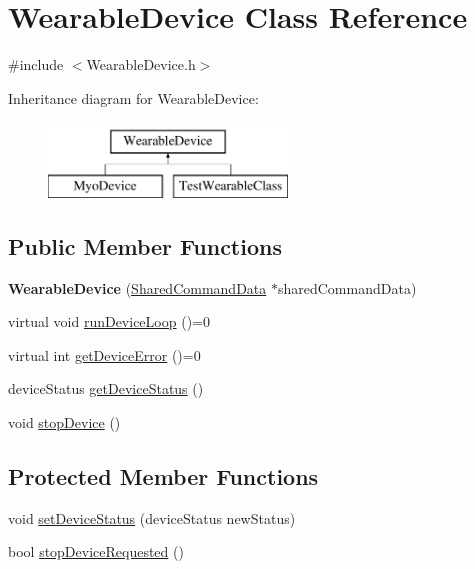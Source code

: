 \hypertarget{class_wearable_device}{\section{Wearable\+Device Class Reference}
\label{class_wearable_device}
}


{\ttfamily \#include $<$Wearable\+Device.\+h$>$}

Inheritance diagram for Wearable\+Device\+:\begin{figure}[H]
\begin{center}
\leavevmode
\includegraphics[height=2.000000cm]{class_wearable_device}
\end{center}
\end{figure}
\subsection*{Public Member Functions}
\begin{DoxyCompactItemize}
\item 
\hypertarget{class_wearable_device_a273b604df5c2136cf7f9c114e4258366}{{\bfseries Wearable\+Device} (\hyperlink{class_shared_command_data}{Shared\+Command\+Data} $\ast$shared\+Command\+Data)}\label{class_wearable_device_a273b604df5c2136cf7f9c114e4258366}

\item 
virtual void \hyperlink{class_wearable_device_a37bf388865b8bcf162e3fe89a23bd3e2}{run\+Device\+Loop} ()=0
\item 
virtual int \hyperlink{class_wearable_device_a1c0b4d47e9949bfcfc7111a2615538c0}{get\+Device\+Error} ()=0
\item 
device\+Status \hyperlink{class_wearable_device_a118d52d7bf27041ce997feb2eac5133d}{get\+Device\+Status} ()
\item 
void \hyperlink{class_wearable_device_abcb46cb71dc666394ba20f4ed52c19f1}{stop\+Device} ()
\end{DoxyCompactItemize}
\subsection*{Protected Member Functions}
\begin{DoxyCompactItemize}
\item 
void \hyperlink{class_wearable_device_a23a9fb3a9558d9a470ef26e59599a255}{set\+Device\+Status} (device\+Status new\+Status)
\item 
bool \hyperlink{class_wearable_device_a8adbcc671888137fcc2de3298e9bf84d}{stop\+Device\+Requested} ()
\end{DoxyCompactItemize}
